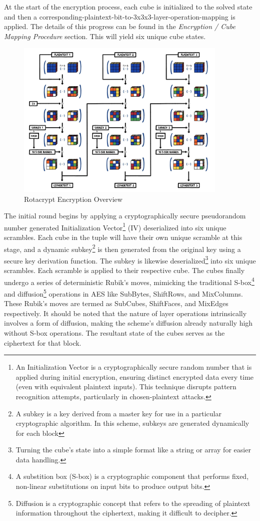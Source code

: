 \documentclass[12pt]{article}
\begin{document}
At the start of the encryption process, each cube is initialized to the solved state and then a corresponding-plaintext-bit-to-3x3x3-layer-operation-mapping is applied. The details of this progress can be found in the \textit{Encryption / Cube Mapping Procedure} section. This will yield six unique cube states.

\begin{figure}[H]
    \centering
    \includegraphics[width=0.9\textwidth]{encryption/encryption.jpg}
    \caption{Rotacrypt Encryption Overview}
\end{figure}

The initial round begins by applying a cryptographically secure pseudorandom number generated Initialization Vector\footnote{An Initialization Vector is a cryptographically secure random number that is applied during initial encryption, ensuring distinct encrypted data every time (even with equivalent plaintext inputs). This technique disrupts pattern recognition attempts, particularly in chosen-plaintext attacks.} (IV) deserialized into six unique scrambles. Each cube in the tuple will have their own unique scramble at this stage, and a dynamic subkey\footnote{A subkey is a key derived from a master key for use in a particular cryptographic algorithm. In this scheme, subkeys are generated dynamically for each block} is then generated from the original key using a secure key derivation function. The subkey is likewise deserialized\footnote{Turning the cube's state into a simple format like a string or array for easier data handling.} into six unique scrambles. Each scramble is applied to their respective cube. The cubes finally undergo a series of deterministic Rubik's moves, mimicking the traditional S-box\footnote{A substition box (S-box) is a cryptographic component that performs fixed, non-linear substitutions on input bits to produce output bits.} and diffusion\footnote{Diffusion is a cryptographic concept that refers to the spreading of plaintext information throughout the ciphertext, making it difficult to decipher.} operations in AES like SubBytes, ShiftRows, and MixColumns. These Rubik's moves are termed as SubCubes, ShiftFaces, and MixEdges respectively. It should be noted that the nature of layer operations intrinsically involves a form of diffusion, making the scheme's diffusion already naturally high without S-box operations. The resultant state of the cubes serves as the ciphertext for that block.
\end{document}

